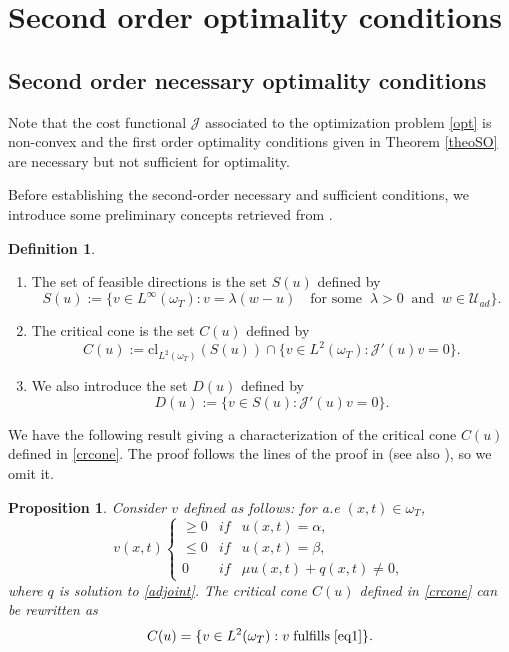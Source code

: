 \documentclass[reqno,twoside]{amsart}
\numberwithin{equation}{section}
\newtheorem{proposition}[theorem]{Proposition}
\theoremstyle{definition}
\newtheorem{definition}[theorem]{Definition}
\numberwithin{equation}{section}
\def \dis {\displaystyle}
\begin{document}
\section{Second order optimality conditions}\label{second}
\subsection{Second order necessary optimality conditions}\label{sufficientoptcond}
Note that the cost functional $\mathcal{J}$ associated to the optimization problem \eqref{opt} is non-convex and the first order optimality conditions given in Theorem \ref{theoSO} are necessary but not sufficient for optimality.

Before establishing the second-order necessary and sufficient conditions, we introduce some preliminary concepts retrieved from \cite{aronna2021,casas2012}.

\begin{definition}
$ $
\begin{enumerate}[-]
	\item The set of feasible directions is the set $S(u)$ defined by
	\begin{equation}\label{fset}
		S(u):=\{v\in L^\infty(\omega_T) : v=\lambda(w-u)\quad\text{for some}\;\;\lambda>0\;\;\text{and}\;\;w\in \mathcal{U}_{ad}\}.
	\end{equation}
	\item The critical cone is the set $C(u)$ defined by
	\begin{equation}\label{crcone}
		C(u):=\text{cl}_{L^2(\omega_T)}(S(u))\cap \{v\in L^2(\omega_T) : \mathcal{J}'(u)v=0\}.
	\end{equation}
	\item We also introduce the set $D(u)$ defined by
	\begin{equation}\label{du}
		D(u):=\{v\in S(u) : \mathcal{J}'(u)v=0\}.
	\end{equation}
\end{enumerate}
\end{definition}
We have the following result giving a characterization of the critical cone $C(u)$ defined in \eqref{crcone}. The proof follows the lines of the proof in \cite[Page 18]{aronna2021} (see also \cite[page 273]{casas2012}), so we omit it.
\begin{proposition}
Consider $v$ defined as follows:
for a.e $(x,t)\in \omega_T$,
\begin{equation}\label{eq1}
	v(x,t)\left\{
	\begin{array}{lllll}
		\dis  \geq 0 &if&  u(x,t)=\alpha,\\
		\dis \leq 0&if& u(x,t)=\beta,\\
		0&if&\mu u(x,t)+q(x,t)\neq 0,
	\end{array}
	\right.
\end{equation}
where $q$ is solution to \eqref{adjoint}.
The critical cone  $C(u)$ defined in \eqref{crcone} can be rewritten as 	
\begin{equation}\label{ccone}
	C(u)= \{v\in L^2(\omega_T) : v \;\text{fulfills}\; \eqref{eq1}\}.
\end{equation}
\end{proposition}
\end{document}
